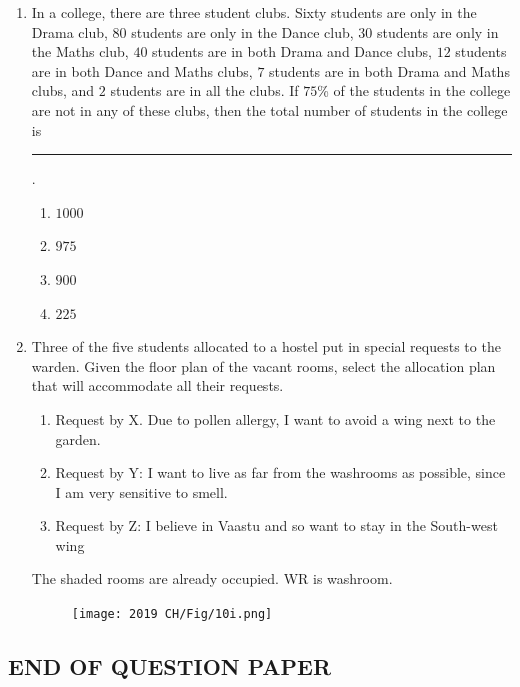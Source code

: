 \documentclass[journal,12pt,onecolumn]{IEEEtran}
\theoremstyle{remark}
\begin{document}
\begin{enumerate}
    \item In a college, there are three student clubs. Sixty students are only in the Drama club, $80$ students are only in the Dance club, $30$ students are only in the Maths club, $40$ students are in both Drama and Dance clubs, $12$ students are in both Dance and Maths clubs, $7$ students are in both Drama and Maths clubs, and $2$ students are in all the clubs. If $75$\% of the students in the college are not in any of these clubs, then the total number of students in the college is \rule{1cm}{0.1mm}.
    
\hfill{}
\begin{multicols}{4}
    \begin{enumerate}
        \item $1000$
        \item $975$
        \item $900$
        \item $225$
    \end{enumerate}
\end{multicols}
\newpage
    \item Three of the five students allocated to a hostel put in special requests to the warden. Given the floor plan of the vacant rooms, select the allocation plan that will accommodate all their requests.
   
\begin{enumerate}[label = ]
    \item Request by X. Due to pollen allergy, I want to avoid a wing next to the garden. 

    \item Request by Y: I want to live as far from the washrooms as possible, since I am very sensitive to smell.

    \item Request by Z: I believe in Vaastu and so want to stay in the South-west wing
\end{enumerate}

The shaded rooms are already occupied. WR is washroom.

 \hfill{}
\begin{figure}[H]
    \centering
    \texttt{[image: 2019 CH/Fig/10i.png]}
    \caption{}
    \label{fig:10i}
\end{figure}
\end{enumerate}
\begin{center}
    \subsection*{END OF QUESTION PAPER}
\end{center}
\newpage
\end{document}
